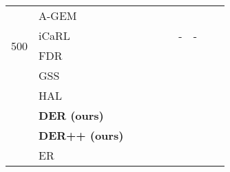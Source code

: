 \documentclass{article}
\begin{document}
\begin{table}[H]
{{\begin{tabular}{clcccccccc}
                        & A-GEM                 &  \tiny{}                                  &   \tiny{}                                  & \tiny{}                                           &  \tiny{}                                          & \tiny{}                                               & \tiny{} \\
\multirow{2}{*}{500}    & iCaRL                 &  \tiny{}                                  &   \tiny{}        & \tiny{}                                           &   \tiny{}                & -                                                                     & -                       \\
                        & FDR                   &  \tiny{}                                  &   \tiny{}                                  & \tiny{}                                           &   \tiny{}                                          & \tiny{}                                               &  \tiny{} \\
                        & GSS                   &  \tiny{}                                  &   \tiny{}                                  &  \tiny{}                                          &   \tiny{}                                          & \tiny{}                                               & \tiny{} \\
                        & HAL                   &   \tiny{}                                  &   \tiny{}                                  & \tiny{}                                           &   \tiny{}                                          & \tiny{}                                               & \tiny{}  \\
                        & \textbf{DER (ours)}   &   \tiny{}                                  &   \tiny{}                                  & \tiny{}                                           &   \tiny{}                                          &  \tiny{}                                               &  \tiny{} \\
                        & \textbf{DER++ (ours)} &   \tiny{}        &   \tiny{}                                  & \tiny{}                 &   \tiny{}                                          &  \tiny{}                     &  \tiny{} \\
\midrule                                                                                            
                        & ER                    &   \tiny{}                                  &   \tiny{}                                  & \tiny{}                                           &   \tiny{}                                          &  \tiny{}                                               &  \tiny{} \\

\end{tabular}}}
\end{table}
\end{document}
